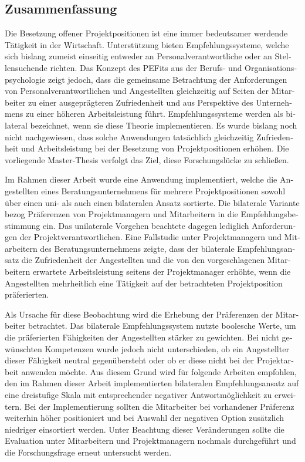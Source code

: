 \begin{otherlanguage}{ngerman}
\chapter*{Zusammenfassung}
Die Besetzung offener Projektpositionen ist eine immer bedeutsamer werdende Tätigkeit in der Wirtschaft. Unterstützung bieten Empfehlungssysteme, welche sich bislang zumeist einseitig entweder an Personalverantwortliche oder an Stellensuchende richten. Das Konzept des \aclp{PEFit} aus der Berufs- und Organisationspsychologie zeigt jedoch, dass die gemeinsame Betrachtung der Anforderungen von Personalverantwortlichen und Angestellten gleichzeitig auf Seiten der Mitarbeiter zu einer ausgeprägteren Zufriedenheit und aus Perspektive des Unternehmens zu einer höheren Arbeitsleistung führt. Empfehlungssysteme werden als bilateral bezeichnet, wenn sie diese Theorie implementieren. Es wurde bislang noch nicht nachgewiesen, dass solche Anwendungen tatsächlich gleichzeitig Zufriedenheit und Arbeitsleistung bei der Besetzung von Projektpositionen erhöhen. Die vorliegende Master-Thesis verfolgt das Ziel, diese Forschungslücke zu schließen.

Im Rahmen dieser Arbeit wurde eine Anwendung implementiert, welche die Angestellten eines Beratungsunternehmens für mehrere Projektpositionen sowohl über einen uni- als auch einen bilateralen Ansatz sortierte. Die bilaterale Variante bezog Präferenzen von Projektmanagern und Mitarbeitern in die Empfehlungsbestimmung ein. Das unilaterale Vorgehen beachtete dagegen lediglich Anforderungen der Projektverantwortlichen. Eine Fallstudie unter Projektmanagern und Mitarbeitern des Beratungsunternehmens zeigte, dass der bilaterale Empfehlungsansatz die Zufriedenheit der Angestellten und die von den vorgeschlagenen Mitarbeitern erwartete Arbeitsleistung seitens der Projektmanager erhöhte, wenn die Angestellten mehrheitlich eine Tätigkeit auf der betrachteten Projektposition präferierten.

Als Ursache für diese Beobachtung wird die Erhebung der Präferenzen der Mitarbeiter betrachtet. Das bilaterale Empfehlungssystem nutzte boolesche Werte, um die präferierten Fähigkeiten der Angestellten stärker zu gewichten. Bei nicht gewünschten Kompetenzen wurde jedoch nicht unterschieden, ob ein Angestellter dieser Fähigkeit neutral gegenübersteht oder ob er diese nicht bei der Projektarbeit anwenden möchte. Aus diesem Grund wird für folgende Arbeiten empfohlen, den im Rahmen dieser Arbeit implementierten bilateralen Empfehlungsansatz auf eine dreistufige Skala mit entsprechender negativer Antwortmöglichkeit zu erweitern. Bei der Implementierung sollten die Mitarbeiter bei vorhandener Präferenz weiterhin höher positioniert und bei Auswahl der negativen Option zusätzlich niedriger einsortiert werden. Unter Beachtung dieser Veränderungen sollte die Evaluation unter Mitarbeitern und Projektmanagern nochmals durchgeführt und die Forschungsfrage erneut untersucht werden.
\end{otherlanguage}
